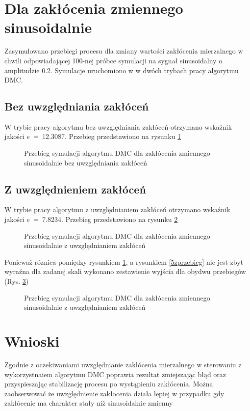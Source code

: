 \section{Dla zakłócenia zmiennego sinusoidalnie}

Zasymulowano przebiegi procesu dla zmiany wartości zakłócenia mierzalnego w chwili odpowiadającej 100-nej próbce symulacji na sygnał sinusoidalny o amplitudzie \num{0.2}. Symulacje uruchomiono w w dwóch trybach pracy algorytmu DMC.



\subsection{Bez uwzględniania zakłóceń}

W trybie pracy algorytmu bez uwzględniania zakłóceń otrzymano wskaźnik jakości $e$~=~\num{12.3087}. Przebieg przedstawiono na rysunku \ref{6przebieg}

\begin{figure}
	
	\centering
	\caption{ Przebieg symulacji algorytmu DMC dla zakłócenia zmiennego sinusoidalnie bez uwzględniania zakłóceń }
	
	\label{6przebieg}
\end{figure}

\subsection{Z uwzględnieniem zakłóceń}

W trybie pracy algorytmu z uwzględnianiem zakłóceń otrzymano wskaźnik jakości $e$~=~\num{7.8234}. Przebieg przedstawiono na rysunku \ref{6zprzebieg}

\begin{figure}
	
	\centering
	\caption{ Przebieg symulacji algorytmu DMC dla zakłócenia zmiennego sinusoidalnie z uwzględnianiem zakłóceń }
	
	\label{6zprzebieg}
\end{figure}

Ponieważ róznica pomiędzy rysunkiem \ref{6przebieg}, a rysunkiem \ref{5zprzebieg} nie jest zbyt wyraźna dla zadanej skali wykonano zestawienie wyjścia dla obydwu przebiegów (Rys. \ref{singraph})

\begin{figure}
	
	\centering
	\caption{ Przebieg symulacji algorytmu DMC dla zakłócenia zmiennego sinusoidalnie z uwzględnianiem zakłóceń }
	
	\label{singraph}
\end{figure}

\section{Wnioski}

Zgodnie z oczekiwaniami uwzględnianie zakłócenia mierzalnego w sterowaniu z wykorzystnaiem algorytmu DMC poprawia rezultat zmiejszając błąd oraz przyspieszając stabilizację procesu po wystąpieniu zakłócenia. Można zaobserwować że uwzględnienie zakłocenia działa lepiej w przypadku gdy zakłócenie ma charakter stały niż sinusoidalnie zmienny